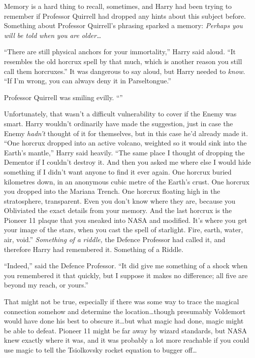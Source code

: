 Memory is a hard thing to recall, sometimes, and Harry had been trying to remember if Professor Quirrell had dropped any hints about this subject before. Something about Professor Quirrell’s phrasing sparked a memory: \emph{Perhaps you will be told when you are older…}

“There are still physical anchors for your immortality,” Harry said aloud. “It resembles the old horcrux spell by that much, which is another reason you still call them horcruxes.” It was dangerous to say aloud, but Harry needed to \emph{know}. “If I’m wrong, you can always deny it in Parseltongue.”

Professor Quirrell was smiling evilly. “”

Unfortunately, that wasn’t a difficult vulnerability to cover if the Enemy was smart. Harry wouldn’t ordinarily have made the suggestion, just in case the Enemy \emph{hadn’t} thought of it for themselves, but in this case he’d already made it. “One horcrux dropped into an active volcano, weighted so it would sink into the Earth’s mantle,” Harry said heavily. “The same place I thought of dropping the Dementor if I couldn’t destroy it. And then you asked me where else I would hide something if I didn’t want anyone to find it ever again. One horcrux buried kilometres down, in an anonymous cubic metre of the Earth’s crust. One horcrux you dropped into the Mariana Trench. One horcrux floating high in the stratosphere, transparent. Even you don’t know where they are, because you Obliviated the exact details from your memory. And the last horcrux is the Pioneer 11 plaque that you sneaked into NASA and modified. It’s where you get your image of the stars, when you cast the spell of starlight. Fire, earth, water, air, void.” \emph{Something of a riddle,} the Defence Professor had called it, and therefore Harry had remembered it. Something of a Riddle.

“Indeed,” said the Defence Professor. “It did give me something of a shock when you remembered it that quickly, but I suppose it makes no difference; all five are beyond my reach, or yours.”

That might not be true, especially if there was some way to trace the magical connection somehow and determine the location…though presumably Voldemort would have done his best to obscure it…but what magic had done, magic might be able to defeat. Pioneer 11 might be far away by wizard standards, but NASA knew exactly where it was, and it was probably a lot more reachable if you could use magic to tell the Tsiolkovsky rocket equation to bugger off…


